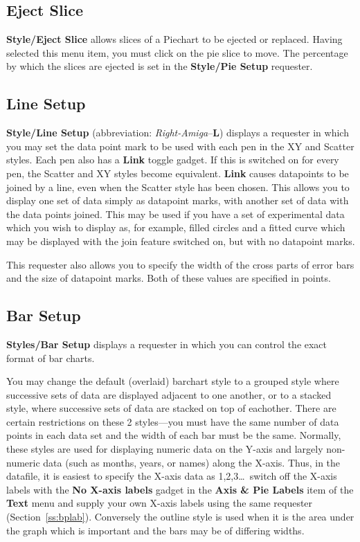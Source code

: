 \documentclass{report}
\newcommand{\RA}[1]{\mbox{{\em Right-Amiga}--{\bf #1}}}
\begin{document}
\subsection{Eject Slice}
{\bf Style/Eject Slice} allows slices of a Piechart to be 
ejected or replaced. 
Having selected this menu item, you must click on the pie slice to move. The 
percentage by which the slices are ejected is set in the {\bf Style/Pie Setup} 
requester.

\subsection{Line Setup}
\label{ss:dp}
{\bf Style/Line Setup}  (abbreviation: \RA{L}) displays a 
requester in which you may set the data point mark 
to be used with each pen in the XY and Scatter styles. Each pen also has a {\bf Link}
toggle gadget. If this is switched on for every pen, the Scatter and XY styles become 
equivalent. {\bf Link} causes datapoints to be joined by a line, even 
when the Scatter 
style has been chosen. This allows you to display one set of data simply as 
datapoint marks, with another set of data with the data points joined. This may 
be used if you have a set of experimental data which you wish to display as, for 
example, filled circles and a fitted curve which may be displayed with the join 
feature switched on, but with no datapoint marks. 

This requester also allows you to specify the width of the cross parts of error 
bars and the size of datapoint marks. Both of these values are specified in points.

\subsection{Bar Setup}
\label{ss:barstyle}
{\bf Styles/Bar Setup}  displays a requester in which 
you can control the exact format of bar charts.

You may change the default (overlaid) barchart style to a grouped style 
 where successive sets of data are displayed adjacent to one 
another, or to a stacked style, where successive sets of data are stacked on top 
of eachother. There are certain restrictions on these 2 styles---you must have the 
same number of data points in each data set and the width of each bar must be the 
same. Normally, these styles are used for displaying numeric data on the Y-axis and 
largely non-numeric data (such as months, years, or names) along the X-axis. 
Thus, in the datafile, it is easiest to specify the X-axis data as 1,2,3\ldots\ 
switch off the X-axis labels with the {\bf No X-axis labels} gadget in the 
{\bf Axis \& Pie Labels} item of the {\bf Text} menu and supply your own X-axis 
labels using the same requester (Section~\ref{ss:bplab}).
Conversely the outline style  is used when it is the area under 
the graph which is important and the bars may be of differing widths.
\end{document}
